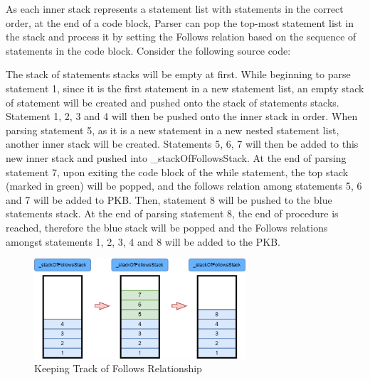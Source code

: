 \documentclass[12pt]{article}
\begin{document}
As each inner stack represents a statement list with statements in the correct order, at the end of a code block, Parser can pop the top-most statement list in the stack and process it by setting the Follows relation based on the sequence of statements in the code block.
\newpage
Consider the following source code:
\begin{center}
\end{center}
\vspace{10mm}
The stack of statements stacks will be empty at first. While beginning to parse statement 1, since it is the first statement in a new statement list, an empty stack of statement will be created and pushed onto the stack of statements stacks. Statement 1, 2, 3 and 4 will then be pushed onto the inner stack in order. When parsing statement 5, as it is a new statement in a new nested statement list, another inner stack will be created. Statements 5, 6, 7 will then be added to this new inner stack and pushed into \_stackOfFollowsStack. At the end of parsing statement 7, upon exiting the code block of the while statement, the top stack (marked in green) will be popped, and the follows relation among statements 5, 6 and 7 will be added to PKB. Then, statement 8 will be pushed to the blue statements stack. At the end of parsing statement 8, the end of procedure is reached, therefore the blue stack will be popped and the Follows relations amongst statements 1, 2, 3, 4 and 8 will be added to the PKB.
\begin{figure}[htbp]
  \caption{Keeping Track of Follows Relationship}
  \centering
    \includegraphics[width=0.7\textwidth]{Parser_AddingFollowsRelationToPKB.png}
\end{figure}
\end{document}
